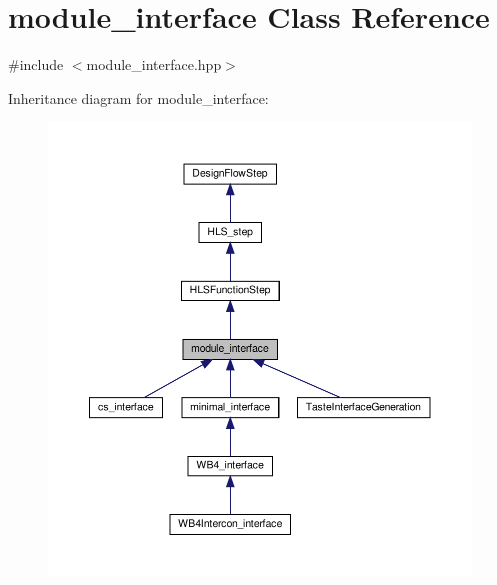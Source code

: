 \hypertarget{classmodule__interface}{}\section{module\+\_\+interface Class Reference}
\label{classmodule__interface}


{\ttfamily \#include $<$module\+\_\+interface.\+hpp$>$}



Inheritance diagram for module\+\_\+interface\+:
\nopagebreak
\begin{figure}[H]
\begin{center}
\leavevmode
\includegraphics[width=350pt]{d5/d5e/classmodule__interface__inherit__graph}
\end{center}
\end{figure}


